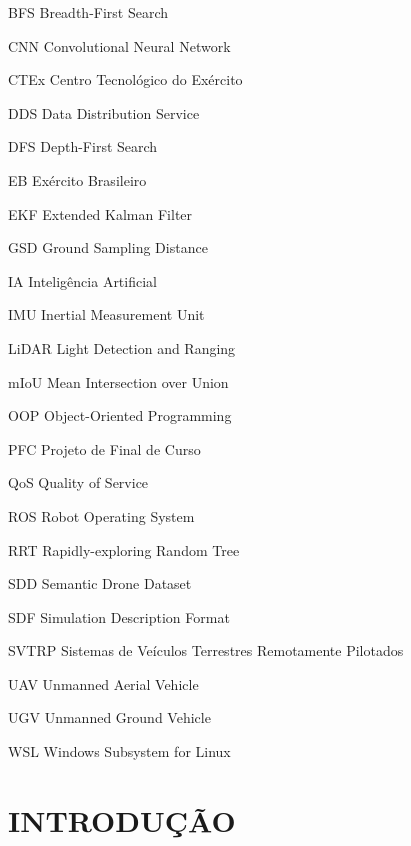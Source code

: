 \documentclass[
    12pt,
    openright,
    oneside,
    a4paper,
    english,
    brazil
]{abntex2}
\begin{document}
\begin{siglas}
    \item[BFS] Breadth-First Search
    \item[CNN] Convolutional Neural Network
    \item[CTEx] Centro Tecnológico do Exército
    \item[DDS] Data Distribution Service
    \item[DFS] Depth-First Search
    \item[EB] Exército Brasileiro
    \item[EKF] Extended Kalman Filter
    \item[GSD] Ground Sampling Distance
    \item[IA] Inteligência Artificial
    \item[IMU] Inertial Measurement Unit
    \item[LiDAR] Light Detection and Ranging
    \item[mIoU] Mean Intersection over Union
    \item[OOP] Object-Oriented Programming
    \item[PFC] Projeto de Final de Curso
    \item[QoS] Quality of Service
    \item[ROS] Robot Operating System
    \item[RRT] Rapidly-exploring Random Tree
    \item[SDD] Semantic Drone Dataset
    \item[SDF] Simulation Description Format
    \item[SVTRP] Sistemas de Veículos Terrestres Remotamente Pilotados
    \item[UAV] Unmanned Aerial Vehicle
    \item[UGV] Unmanned Ground Vehicle
    \item[WSL] Windows Subsystem for Linux
\end{siglas}

\tableofcontents*
\cleardoublepage

\textual

\chapter{INTRODUÇÃO}
\end{document}
